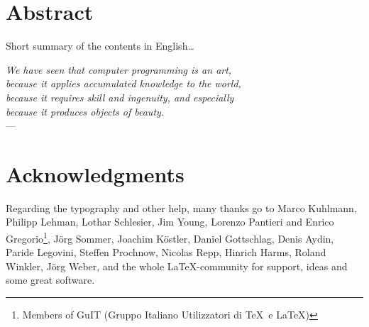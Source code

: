 \documentclass[ twoside,openright,titlepage,numbers=noenddot,headinclude,
                footinclude=true,cleardoublepage=empty,abstractoff,%
                BCOR=5mm,paper=letter,fontsize=11pt,letterpaper,%
                american,%
                ]{scrreprt}
\newcounter{dummy}
\begin{document}
\cleardoublepage
{}
\begingroup
\let\clearpage\relax
\let\cleardoublepage\relax
\let\cleardoublepage\relax
\chapter*{Abstract}
Short summary of the contents in English\dots
\endgroup
\vfill


\cleardoublepage
{}
\begin{flushright}{\slshape
    We have seen that computer programming is an art, \\
    because it applies accumulated knowledge to the world, \\
    because it requires skill and ingenuity, and especially \\
    because it produces objects of beauty.} \\ \medskip
    ---  \citep{knuth:1974}
\end{flushright}
\bigskip
\begingroup
\let\clearpage\relax
\let\cleardoublepage\relax
\let\cleardoublepage\relax
\chapter*{Acknowledgments}
Regarding the typography and other help, many thanks go to Marco
Kuhlmann, Philipp Lehman, Lothar Schlesier, Jim Young, Lorenzo
Pantieri and Enrico Gregorio\footnote{Members of GuIT (Gruppo
Italiano Utilizzatori di \TeX\ e \LaTeX )}, J\"org Sommer,
Joachim K\"ostler, Daniel Gottschlag, Denis Aydin, Paride
Legovini, Steffen Prochnow, Nicolas Repp, Hinrich Harms,
 Roland Winkler, J\"org Weber,
 and the whole \LaTeX-community for support, ideas and
 some great software.
\endgroup


\pagestyle{scrheadings}
{}
\setcounter{tocdepth}{2} %
\setcounter{secnumdepth}{3} %
\manualmark
\markboth{\spacedlowsmallcaps{\contentsname}}{\spacedlowsmallcaps{\contentsname}}
\tableofcontents
{}
\renewcommand{\chaptermark}[1]{\markboth{\spacedlowsmallcaps{#1}}{\spacedlowsmallcaps{#1}}}
\renewcommand{\sectionmark}[1]{\markright{\thesection\enspace\spacedlowsmallcaps{#1}}}
\clearpage
\begingroup
    \let\clearpage\relax
    \let\cleardoublepage\relax
    \let\cleardoublepage\relax
\end{document}
